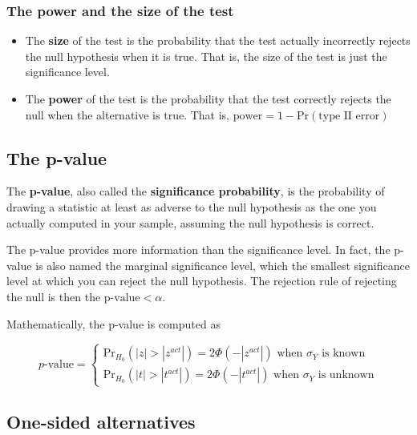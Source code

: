 \documentclass[a4paper,11pt]{article}
\begin{document}
\subsubsection*{The power and the size of the test}
\label{sec:orgdcb6f6f}

\begin{itemize}
\item The \textbf{size} of the test is the probability that the test actually
incorrectly rejects the null hypothesis when it is true. That is,
the size of the test is just the significance level.

\item The \textbf{power} of the test is the probability that the test correctly
rejects the null when the alternative is true. That is,
\(\text{power} = 1 - \mathrm{Pr}(\text{type II error})\)
\end{itemize}

\subsection{The p-value}
\label{sec:org66f4208}

The \textbf{p-value}, also called the \textbf{significance probability}, is the
probability of drawing a statistic at least as adverse to the null
hypothesis as the one you actually computed in your sample, assuming
the null hypothesis is correct.

The p-value provides more information than the significance level. In
fact, the p-value is also named the marginal significance level, which
the smallest significance level at which you can reject the null
hypothesis. The rejection rule of rejecting the null is then the
\(\text{p-value} < \alpha\).

Mathematically, the p-value is computed as

\begin{equation*}
p\text{-value} = 
\begin{cases}
\mathrm{Pr}_{H_0}\left(|z| > |z^{act}|\right)=2\Phi(-|z^{act}|) \text{ when } \sigma_Y \text{ is known} \\
\mathrm{Pr}_{H_0}\left(|t| > |t^{act}|\right)=2\Phi(-|t^{act}|) \text{ when } \sigma_Y \text{ is unknown}
\end{cases}
\end{equation*}

\subsection{One-sided alternatives}
\label{sec:org9095f7b}
\end{document}
